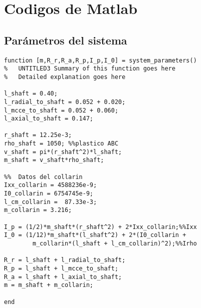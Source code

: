 \chapter{Codigos de Matlab}

\section{Par\'ametros del sistema}

\begin{lstlisting}[frame=single]
function [m,R_r,R_a,R_p,I_p,I_0] = system_parameters()
%	UNTITLED3 Summary of this function goes here
%   Detailed explanation goes here

l_shaft = 0.40;
l_radial_to_shaft = 0.052 + 0.020;
l_mcce_to_shaft = 0.052 + 0.060;
l_axial_to_shaft = 0.147;

r_shaft = 12.25e-3;
rho_shaft = 1050; %%plastico ABC
v_shaft = pi*(r_shaft^2)*l_shaft;
m_shaft = v_shaft*rho_shaft;

%%	Datos del collarin
Ixx_collarin = 4588236e-9;
I0_collarin = 6754745e-9;
l_cm_collarin =  87.33e-3;
m_collarin = 3.216;

I_p = (1/2)*m_shaft*(r_shaft^2) + 2*Ixx_collarin;%%Ixx
I_0 = (1/12)*m_shaft*(l_shaft^2) + 2*(I0_collarin + 
		m_collarin*(l_shaft + l_cm_collarin)^2);%%Irho

R_r = l_shaft + l_radial_to_shaft;
R_p = l_shaft + l_mcce_to_shaft;
R_a = l_shaft + l_axial_to_shaft;
m = m_shaft + m_collarin;

end
\end{lstlisting}


